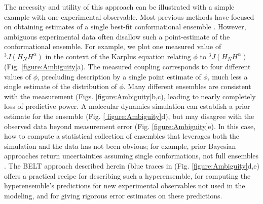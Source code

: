 \documentclass[journal=jacsat,manuscript=article]{achemso}
\begin{document}
The necessity and utility of this approach can be illustrated with a simple example with one experimental observable. Most previous methods have focused on obtaining estimates of a single best-fit conformational ensemble  \cite{rozycki2011saxs,  Graf2007, chodera2012}.  However, ambiguous experimental data often disallow such a point-estimate of the conformational ensemble.  For example, we plot one measured  \cite{Graf2007} value of $^3J(H_NH^\alpha)$ in the context of the Karplus \cite{vogeli2007limits} equation relating $\phi$ to $^3J(H_NH^\alpha)$ (Fig. \ref{figure:Ambiguity}a).  The measured coupling corresponds to four different values of $\phi$, precluding description by a single point estimate of $\phi$, much less a single estimate of the distribution of $\phi$. Many different ensembles are consistent with the measurement (Figs. \ref{figure:Ambiguity}b,c), leading to nearly completely loss of predictive power. A molecular dynamics simulation can establish a prior estimate for the ensemble (Fig. \ref{
figure:Ambiguity}d), but may disagree with the observed data 
beyond measurement error (Fig. \ref{figure:Ambiguity}e). In this case, how to compute a statistical collection of ensembles that leverages both the simulation and the data has not been obvious; for example, prior Bayesian approaches return uncertainties assuming single conformations, not full ensembles \cite{rieping2005}.  The BELT approach described herein (blue traces in (Fig. \ref{figure:Ambiguity}d,e) offers a practical recipe for describing such a hyperensemble, for computing the hyperensemble's predictions for new experimental observables not used in the modeling, and for giving rigorous error estimates on these predictions.
\end{document}
